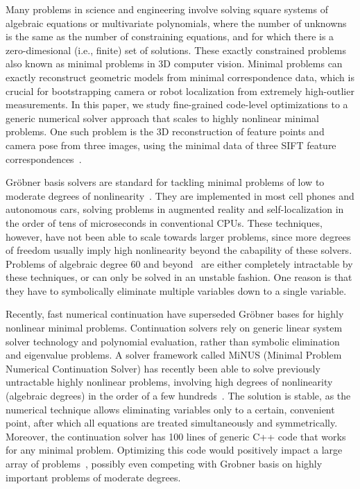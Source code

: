 \documentclass[10pt,conference]{IEEEtran}
\begin{document}
\nocite{Sibgrapi2021}

Many problems in science and engineering involve solving square systems of
algebraic equations or multivariate polynomials, where the number of unknowns is
the same as the number of constraining equations, and for which there is a
zero-dimesional (i.e., finite) set of solutions. These exactly constrained 
problems also known as minimal problems in 3D computer vision. Minimal problems
can exactly reconstruct geometric models from minimal correspondence data, which is crucial
for bootstrapping camera or robot localization from extremely high-outlier
measurements. In this paper, we study fine-grained code-level optimizations to a
generic numerical solver
approach that scales to highly nonlinear minimal problems. One such problem is the 3D
reconstruction of feature points and camera pose from three images, using the
minimal data of three SIFT feature correspondences~\cite{Fabbri:etal:CVPR2020}.

Gr\"obner basis solvers are standard for tackling minimal problems of low to
moderate degrees of nonlinearity~\cite{grobner}. They are implemented in most
cell phones and autonomous cars, solving problems in augmented reality and
self-localization in the order of tens of microseconds in conventional CPUs.
%
%
These techniques, however, have not been able to scale towards larger 
problems, since more degrees of freedom usually imply high nonlinearity beyond
the cabapility of these solvers. Problems of algebraic degree 60 and
beyond~\cite{} are either completely intractable by these techniques, or can
only be solved in an unstable fashion. One reason is that they have to
symbolically eliminate multiple variables down to a single variable.

Recently, fast numerical continuation have superseded Gr\"obner bases for highly
nonlinear minimal problems. Continuation solvers rely on generic
linear system solver technology and polynomial evaluation, rather than symbolic elimination and eigenvalue
problems. A solver framework called MiNUS (Minimal Problem Numerical
Continuation Solver) has recently been able to solve previously untractable
highly nonlinear problems, involving high degrees of nonlinearity (algebraic degrees)
in the order of a few hundreds~\cite{}.  The solution is stable, as the
numerical technique allows eliminating variables only to a certain, convenient
point, after which all equations are treated simultaneously and symmetrically.
Moreover, the continuation solver has 100 lines of generic C++ code that works
for any minimal problem. Optimizing this code would positively impact a large
array of problems~\cite{Tim}, possibly even competing with Grobner basis on
highly important problems of moderate degrees.
\end{document}
